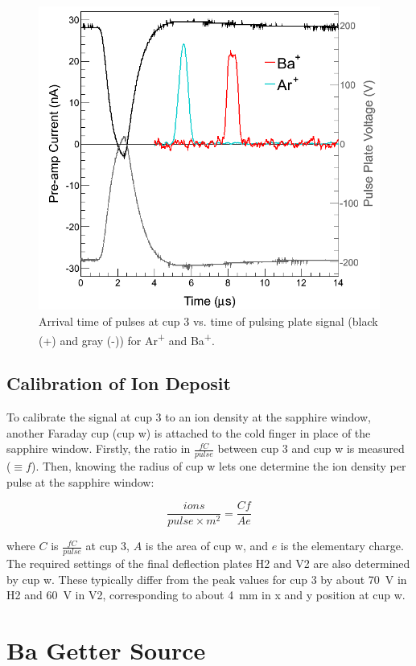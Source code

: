 \begin{figure}[h]
        \centering
                \includegraphics[width=.7\textwidth]{figures/pulses_BaAr.png}
                \caption{Arrival time of pulses at cup 3 vs. time of pulsing plate signal (black (+) and gray (-)) for Ar\textsuperscript{+} and Ba\textsuperscript{+}.}
\label{fig:pulses_ArBa}
\end{figure}

\subsection{Calibration of Ion Deposit}
\label{subsec:ionDepCal}

To calibrate the signal at cup 3 to an ion density at the sapphire window, another Faraday cup (cup w) is attached to the cold finger in place of the sapphire window.  Firstly, the ratio in $\frac{fC}{pulse}$ between cup 3 and cup w is measured ($\equiv f$).  Then, knowing the radius of cup w lets one determine the ion density per pulse at the sapphire window:

\begin{equation}
\frac{ions}{pulse \times m^{2}} = \frac{C f}{A e}
\label{eqn:ion_density}
\end{equation}

\noindent
where $C$ is $\frac{fC}{pulse}$ at cup 3, $A$ is the area of cup w, and $e$ is the elementary charge.  The required settings of the final deflection plates H2 and V2 are also determined by cup w.  These typically differ from the peak values for cup 3 by about 70~V in H2 and 60~V in V2, corresponding to about 4~mm in x and y position at cup w.

\section{Ba Getter Source}

